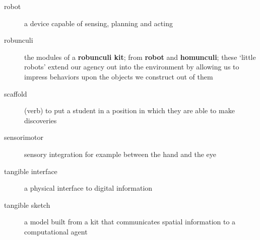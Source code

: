 \begin{description}
%
\item[robot] a device capable of sensing, planning and acting
%
\item[robunculi] the modules of a {\bf robunculi kit}; from {\bf robot} and {\bf homunculi}; these `little robots' extend our agency out into the environment by allowing us to impress behaviors upon the objects we construct out of them
%
\item[scaffold] (verb) to put a student in a position in which they are able to make discoveries
%
\item[sensorimotor] sensory integration for example between the hand and the eye
%
\item[tangible interface] a physical interface to digital information
%
\item[tangible sketch] a model built from a kit that communicates spatial information to a computational agent
%
\end{description}
